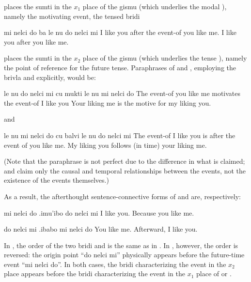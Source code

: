 {\noindent}places the  sumti in the $x_1$ place of the gismu
     (which underlies the modal ), namely the
    motivating event, the tensed bridi
\begin{example}
mi nelci do ba le nu do nelci mi\n
I like you after the event-of you like me.\n
I like you after you like me.
\end{example}

{\noindent}places the  sumti in the $x_2$ place of the gismu
     (which underlies the tense ), namely the point
    of reference for the future tense. Paraphrases of  and , employing the brivla  and 
    explicitly, would be:
\begin{example}
le nu do nelci mi cu mukti le nu mi nelci do\n
The event-of you like me motivates the event-of I like you\n
Your liking me is the motive for my liking you.
\end{example}

{\noindent}and
\begin{example}
le nu mi nelci do cu balvi le nu do nelci mi\n
The event-of I like you is after the event of you like me.\n
My liking you follows (in time) your liking me.
\end{example}

(Note that the paraphrase is not perfect due to the difference
    in what is claimed;  and  claim only the causal and
    temporal relationships between the events, not the existence of
    the events themselves.) 

As a result, the afterthought sentence-connective forms of and  are, respectively:
\begin{example}
mi nelci do .imu'ibo do nelci mi\n
I like you.   Because you like me.
\end{example}

\begin{example}
do nelci mi .ibabo mi nelci do\n
You like me.  Afterward, I like you.
\end{example}

In , the order of the two
    bridi  and  is the same as in . In , however, the order is reversed: the origin point ``do
    nelci mi'' physically appears before the future-time event ``mi
    nelci do''. In both cases, the bridi characterizing the event
    in the $x_2$ place appears before the bridi characterizing the
    event in the $x_1$ place of  or .

